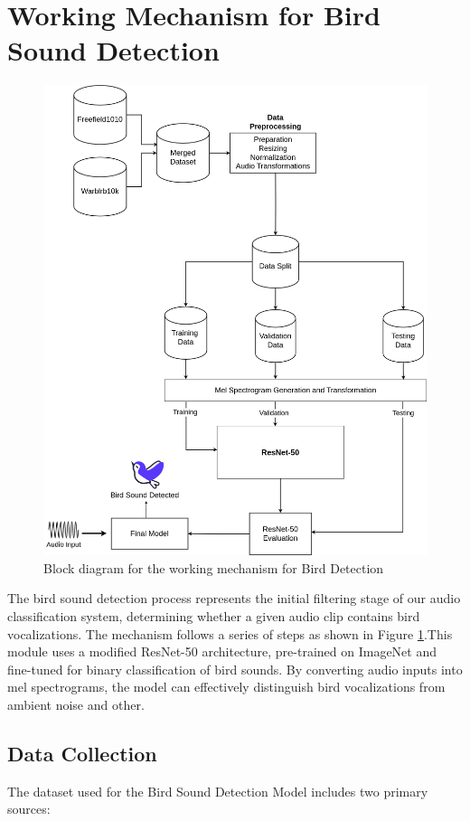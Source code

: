 \section{Working Mechanism for Bird Sound Detection}
      \begin{figure}[h!]
            \centering
            \includegraphics[scale=0.33]{images/DetectionMethodology.png}
            \caption{Block diagram for the working mechanism for Bird Detection}
            \label{fig:working_bird_det}
      \end{figure}
      \newpage
      The bird sound detection process represents the initial filtering stage of our audio classification system, determining whether a given audio clip contains bird vocalizations. The mechanism follows a series of steps as shown in Figure \ref{fig:working_bird_det}.This module uses a modified ResNet-50 architecture, pre-trained on ImageNet and fine-tuned for binary classification of bird sounds. By converting audio inputs into mel spectrograms, the model can effectively distinguish bird vocalizations from ambient noise and other.
      \subsection{Data Collection}
      The dataset used for the Bird Sound Detection Model includes two primary sources:

